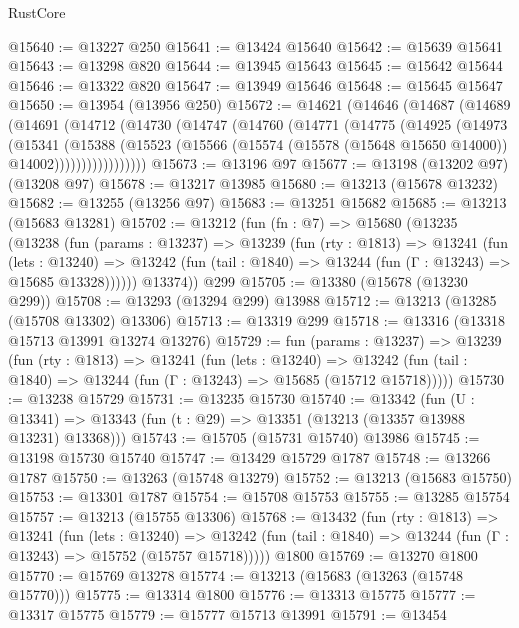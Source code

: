 \begin{lexlean}{RustCore}
\begin{coremodule}
@15640 := @13227 @250
@15641 := @13424 @15640
@15642 := @15639 @15641
@15643 := @13298 @820
@15644 := @13945 @15643
@15645 := @15642 @15644
@15646 := @13322 @820
@15647 := @13949 @15646
@15648 := @15645 @15647
@15650 := @13954 (@13956 @250)
@15672 := @14621
    (@14646
      (@14687
        (@14689
          (@14691
            (@14712
              (@14730
                (@14747
                  (@14760
                    (@14771
                      (@14775
                        (@14925
                          (@14973
                            (@15341
                              (@15388
                                (@15523
                                  (@15566
                                    (@15574 (@15578 (@15648 @15650 @14000)) @14002)))))))))))))))))
@15673 := @13196 @97
@15677 := @13198 (@13202 @97) (@13208 @97)
@15678 := @13217 @13985
@15680 := @13213 (@15678 @13232)
@15682 := @13255 (@13256 @97)
@15683 := @13251 @15682
@15685 := @13213 (@15683 @13281)
@15702 := @13212
    (fun (fn : @7) =>
    @15680
      (@13235
        (@13238
          (fun (params : @13237) =>
          @13239
            (fun (rty : @1813) =>
            @13241
              (fun (lets : @13240) =>
              @13242 (fun (tail : @1840) => @13244 (fun (Γ : @13243) => @15685 @13328))))))
        @13374))
    @299
@15705 := @13380 (@15678 (@13230 @299))
@15708 := @13293 (@13294 @299) @13988
@15712 := @13213 (@13285 (@15708 @13302) @13306)
@15713 := @13319 @299
@15718 := @13316 (@13318 @15713 @13991 @13274 @13276)
@15729 := fun (params : @13237) =>
  @13239
    (fun (rty : @1813) =>
    @13241
      (fun (lets : @13240) =>
      @13242 (fun (tail : @1840) => @13244 (fun (Γ : @13243) => @15685 (@15712 @15718)))))
@15730 := @13238 @15729
@15731 := @13235 @15730
@15740 := @13342
    (fun (U : @13341) => @13343 (fun (t : @29) => @13351 (@13213 (@13357 @13988 @13231) @13368)))
@15743 := @15705 (@15731 @15740) @13986
@15745 := @13198 @15730 @15740
@15747 := @13429 @15729 @1787
@15748 := @13266 @1787
@15750 := @13263 (@15748 @13279)
@15752 := @13213 (@15683 @15750)
@15753 := @13301 @1787
@15754 := @15708 @15753
@15755 := @13285 @15754
@15757 := @13213 (@15755 @13306)
@15768 := @13432
    (fun (rty : @1813) =>
    @13241
      (fun (lets : @13240) =>
      @13242 (fun (tail : @1840) => @13244 (fun (Γ : @13243) => @15752 (@15757 @15718)))))
    @1800
@15769 := @13270 @1800
@15770 := @15769 @13278
@15774 := @13213 (@15683 (@13263 (@15748 @15770)))
@15775 := @13314 @1800
@15776 := @13313 @15775
@15777 := @13317 @15775
@15779 := @15777 @15713 @13991
@15791 := @13454

\end{coremodule}
\end{lexlean}
